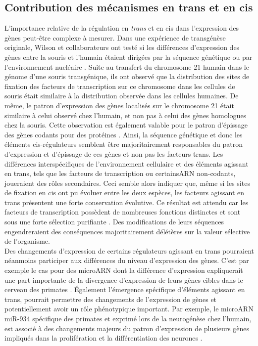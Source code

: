 \subsection{Contribution des mécanismes en \gls{trans} et en \gls{cis}}
\label{subsec:contrib-cis-trans}

L’importance relative de la régulation en \textit{trans} et en \gls{cis} dans l’expression des gènes peut-être complexe à mesurer. Dans une expérience de transgénèse originale, Wilson et collaborateurs ont testé si les différences d’expression des gènes entre la souris et l’humain étaient dirigées par la séquence génétique ou par l’environnement nucléaire \citep{wilson_species-specific_2008}. Suite au transfert du chromosome 21 humain dans le génome d’une souris transgénique, ils ont observé que la distribution des sites de fixation des facteurs de transcription sur ce chromosome dans les cellules de souris était similaire à la distribution observée dans les cellules humaines. De même, le patron d’expression des gènes localisés sur le chromosome 21 était similaire à celui observé chez l’humain, et non pas à celui des gènes homologues chez la souris. Cette observation est également valable pour le patron d’épissage des gènes codants pour des protéines \citep{barbosa-morais_evolutionary_2012}. Ainsi, la séquence génétique et donc les éléments \gls{cis}-régulateurs semblent être majoritairement responsables du patron d’expression et d’épissage de ces gènes et non pas les facteurs trans. Les différences interspécifiques de l’environnement cellulaire et des éléments agissant en trans, tels que les facteurs de transcription ou certains\acrshort{ARN} non-codants, joueraient des rôles secondaires. Ceci semble alors indiquer que, même si les sites de fixation en cis ont pu évoluer entre les deux espèces, les facteurs agissant en trans présentent une forte conservation évolutive. Ce résultat est attendu car les facteurs de transcription possèdent de nombreuses fonctions distinctes et sont sous une forte sélection purifiante \citep{wray_evolutionary_2007}. Des modifications de leurs séquences engendreraient des conséquences majoritairement délétères sur la valeur sélective de l’organisme. \\

Des changements d’expression de certains régulateurs agissant en trans pourraient néanmoins participer aux différences du niveau d’expression des gènes. C’est par exemple le cas pour des microARN dont la différence d’expression expliquerait une part importante de la divergence d’expression de leurs gènes cibles dans le cerveau des primates \citep{hu_microrna_2011}. Également l’émergence spécifique d’éléments agissant en trans, pourrait permettre des changements de l’expression de gènes et potentiellement avoir un rôle phénotypique important. Par exemple, le microARN miR-934 spécifique des primates et exprimé lors de la neurogénèse chez l’humain, est associé à des changements majeurs du patron d’expression de plusieurs gènes impliqués dans la prolifération et la différentiation des neurones \citep{prodromidou_microrna-934_2020}.

